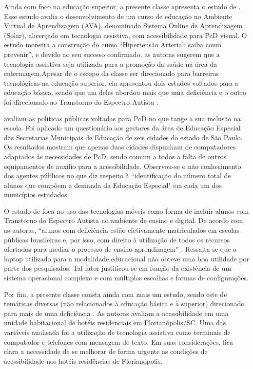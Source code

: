 \documentclass{textolivre}
\begin{document}
Ainda com foco na educação superior, a presente classe apresenta o estudo de \textcite{carvalho2018}. Esse estudo avalia o desenvolvimento de um curso de educação no Ambiente Virtual de Aprendizagem (AVA), denominado Sistema Online de Aprendizagem (Solar), alicerçado em tecnologia assistiva, com acessibilidade para PcD visual. O estudo monstra a construção do curso “Hipertensão Arterial: saiba como prevenir”, e devido ao seu sucesso confirmado, as autoras sugerem que a tecnologia assistiva seja utilizada para a promoção da saúde na área da enfermagem.Apesar de o escopo da classe ser direcionado para barreiras tecnológicas na educação superior, ela apresentou dois estudos voltados para a educação básica, sendo que um deles abordou mais que uma deficiência \cite{marins2009} e o outro foi direcionado ao Transtorno do Espectro Autista \cite{santarosa2015}.

\textcite{marins2009} avaliam as políticas públicas voltadas para PcD no que tange a sua inclusão na escola. Foi aplicado um questionário aos gestores da área de Educação Especial das Secretarias Municipais de Educação de seis cidades do estado de São Paulo. Os resultados mostram que apenas duas cidades dispunham de computadores adaptados às necessidades de PcD, sendo comum a todos a falta de outros equipamentos de auxílio para a acessibilidade. Observou-se o não conhecimento dos agentes públicos no que diz respeito à “identificação do número total de alunos que compõem a demanda da Educação Especial" \cite[p. 61]{marins2009} em cada um dos municípios estudados.

O estudo de \textcite{santarosa2015} foca no uso das tecnologias móveis como forma de incluir alunos com Transtorno do Espectro Autista no ambiente de ensino e digital. De acordo com as autoras, “alunos com deficiência estão efetivamente matriculados em escolas públicas brasileiras e, por isso, com direito à utilização de todos os recursos ofertados para mediar o processo de ensino-aprendizagem” \cite[p. 363]{santarosa2015}. Ressalta-se que o laptop utilizado para a modalidade educacional não obteve uma boa utilidade por parte dos pesquisados. Tal fator justificou-se em função da existência de um sistema operacional complexo e com múltiplas escolhas e formas de configurações.

Por fim, a presente classe consta ainda com mais um estudo, sendo este de temáticas diversas (não relacionados à educação básica e à superior) direcionado para mais de uma deficiência \cite{ely2009}. As autoras avaliam a acessibilidade em uma unidade habitacional de hotéis residenciais em Florianópolis/SC. Uma das variáveis analisada foi a utilização de tecnologia assistiva como terminais de computador e telefones com mensagem de texto. Em suas considerações, fica clara a necessidade de se melhorar de forma urgente as condições de acessibilidade nos hotéis residências de Florianópolis.
\end{document}
